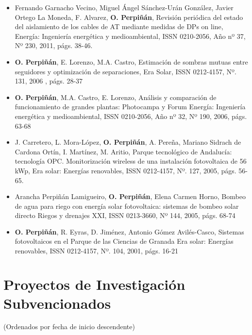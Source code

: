 \documentclass[article, a4paper]{memoir}
\begin{document}
\begin{itemize}
\item Fernando Garnacho Vecino, Miguel Ángel Sánchez-Urán González, Javier Ortego La Moneda, F. Alvarez, \textbf{O. Perpiñán}, Revisión periódica del estado del aislamiento de los cables de AT mediante medidas de DPs on line, Energía: Ingeniería energética y medioambiental, ISSN 0210-2056, Año nº 37, Nº 230, 2011, págs. 38-46.

\item \textbf{O. Perpiñán}, E. Lorenzo, M.A. Castro, Estimación de sombras mutuas entre seguidores y optimización de separaciones, Era Solar, ISSN 0212-4157, Nº. 131, 2006 , págs. 28-37

\item \textbf{O. Perpiñán}, M.A. Castro, E. Lorenzo, Análisis y comparación de funcionamiento de grandes plantas: Photocampa y Forum Energía: Ingeniería energética y medioambiental, ISSN 0210-2056, Año nº 32, Nº 190, 2006, págs. 63-68

\item J. Carretero, L. Mora-López, \textbf{O. Perpiñán}, A. Pereña, Mariano Sidrach de Cardona Ortín, I. Martínez, M. Aritio, Parque tecnológico de Andalucía: tecnología OPC. Monitorización wireless de una instalación fotovoltaica de 56 kWp, Era solar: Energías renovables, ISSN 0212-4157, Nº. 127, 2005, págs. 56-65.

\item Arancha Perpiñán Lamigueiro, \textbf{O. Perpiñán}, Elena Carmen Horno, Bombeo de agua para riego con energía solar fotovoltaica: sistemas de bombeo solar directo Riegos y drenajes XXI, ISSN 0213-3660, Nº 144, 2005, págs. 68-74

\item \textbf{O. Perpiñán}, R. Eyras, D. Jiménez, Antonio Gómez Avilés-Casco, Sistemas fotovoltaicos en el Parque de las Ciencias de Granada Era solar: Energías renovables, ISSN 0212-4157, Nº. 104, 2001, págs. 16-21
\end{itemize}


\section{Proyectos de Investigación Subvencionados}
\label{sec-8}
(Ordenados por fecha de inicio descendente)
\end{document}
